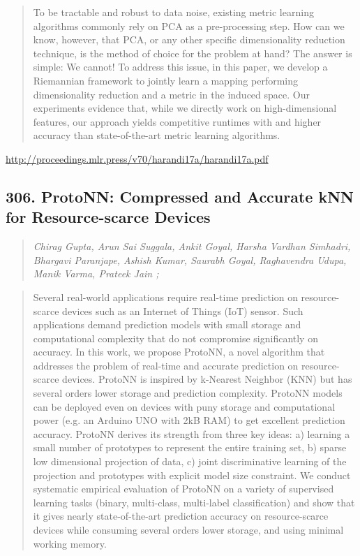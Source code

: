 \documentclass{article}
\begin{document}
\begin{quote}
    To be tractable and robust to data noise, existing metric learning algorithms commonly rely on PCA as a pre-processing step. How can we know, however, that PCA, or any other specific dimensionality reduction technique, is the method of choice for the problem at hand? The answer is simple: We cannot! To address this issue, in this paper, we develop a Riemannian framework to jointly learn a mapping performing dimensionality reduction and a metric in the induced space. Our experiments evidence that, while we directly work on high-dimensional features, our approach yields competitive runtimes with and higher accuracy than state-of-the-art metric learning algorithms.  
\end{quote}

\href{http://proceedings.mlr.press/v70/harandi17a/harandi17a.pdf}{http://proceedings.mlr.press/v70/harandi17a/harandi17a.pdf}

\subsection{306. ProtoNN: Compressed and Accurate kNN for Resource-scarce Devices}

\begin{quote}
\footnotesize{\textit{Chirag Gupta, Arun Sai Suggala, Ankit Goyal, Harsha Vardhan Simhadri, Bhargavi Paranjape, Ashish Kumar, Saurabh Goyal, Raghavendra Udupa, Manik Varma, Prateek Jain ;}}

\end{quote}

\begin{quote}
    Several real-world applications require real-time prediction on resource-scarce devices such as an Internet of Things (IoT) sensor. Such applications demand prediction models with small storage and computational complexity that do not compromise significantly on accuracy. In this work, we propose ProtoNN, a novel algorithm that addresses the problem of real-time and accurate prediction on resource-scarce devices. ProtoNN is inspired by k-Nearest Neighbor (KNN) but has several orders lower storage and prediction complexity. ProtoNN models can be deployed even on devices with puny storage and computational power (e.g. an Arduino UNO with 2kB RAM) to get excellent prediction accuracy. ProtoNN derives its strength from three key ideas: a) learning a small number of prototypes to represent the entire training set, b) sparse low dimensional projection of data, c) joint discriminative learning of the projection and prototypes with explicit model size constraint. We conduct systematic empirical evaluation of ProtoNN on a variety of supervised learning tasks (binary, multi-class, multi-label classification) and show that it gives nearly state-of-the-art prediction accuracy on resource-scarce devices while consuming several orders lower storage, and using minimal working memory.  
\end{quote}
\end{document}
